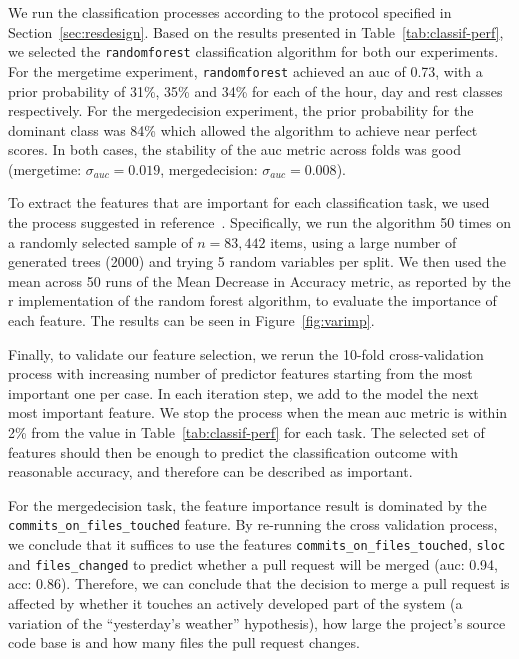 \documentclass{sig-alternate}
\begin{document}
We run the classification processes according to the protocol specified in
Section~\ref{sec:resdesign}.  Based on the results presented in
Table~\ref{tab:classif-perf}, we selected the \texttt{randomforest}
classification algorithm for both our experiments. For the \textsf{mergetime}
experiment, \texttt{randomforest} achieved an {\sc auc} of 0.73, with a prior
probability of 31\%, 35\% and 34\% for each of the \textsf{hour}, \textsf{day}
and \textsf{rest} classes respectively. For the \textsf{mergedecision}
experiment, the prior probability for the dominant class was 84\% which allowed
the algorithm to achieve near perfect scores. In both cases, the stability of
the {\sc auc} metric across folds was good (\textsf{mergetime}: $\sigma_{auc} =
0.019$, \textsf{mergedecision}: $\sigma_{auc} = 0.008$).

\begin{figure*}
\centering
{}
\caption{Random forest feature importance for predicting merge decision (a) and merge time (b)}
\label{fig:varimp}
\end{figure*}

To extract the features that are important for each classification task, we used
the process suggested in reference~\cite{Genue10}. Specifically, we run the
algorithm 50 times on a randomly selected sample of $n = 83,442$ items, using a
large number of generated trees (2000) and trying 5 random variables per split.
We then used the mean across 50 runs of the  Mean Decrease in Accuracy metric,
as reported by the {\sc r} implementation of the random forest algorithm, to
evaluate the importance of each feature. The results can be seen in
Figure~\ref{fig:varimp}.

Finally, to validate our feature selection, we rerun the 10-fold
cross-validation process with increasing number of predictor features starting
from the most important one per case.  In each iteration step, we add to the
model the next most important feature.  We stop the process when the mean {\sc
auc} metric is within 2\% from the value in Table~\ref{tab:classif-perf} for
each task. The selected set of features should then be enough to predict the
classification outcome with reasonable accuracy, and therefore can be described
as important.

For the \textsf{mergedecision} task, the feature importance result is dominated
by the \texttt{commits\_\-on\_\-files\_\-touched} feature. By re-running the cross
validation process, we conclude that it suffices to use the features
 \texttt{commits\_\-on\_\-files\_\-touched}, \texttt{sloc} and \texttt{files\_changed}
to predict whether a pull request will be merged ({\sc auc:} 0.94, {\sc acc}:
0.86). Therefore, we can conclude that the decision to merge a pull request is
affected by whether it touches an actively developed part of the system (a
variation of the ``yesterday's weather'' hypothesis), how large the project's
source code base is and how many files the pull request changes.
\end{document}
